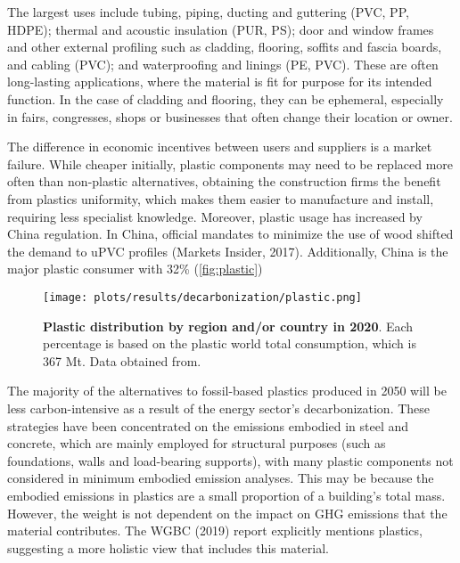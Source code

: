 The largest uses include tubing, piping, ducting and guttering (PVC, PP, HDPE); thermal and acoustic insulation (PUR, PS); door and window frames and other external profiling such as cladding, flooring, soffits and fascia boards, and cabling (PVC); and waterproofing and linings (PE, PVC). These are often long-lasting applications, where the material is fit for purpose for its intended function.\autocite{asbp_2020} In the case of cladding and flooring, they can be ephemeral, especially in fairs, congresses, shops or businesses that often change their location or owner.

The difference in economic incentives between users and suppliers is a market failure. While cheaper initially, plastic components may need to be replaced more often than non-plastic alternatives, obtaining the construction firms the benefit from plastics uniformity, which makes them easier to manufacture and install, requiring less specialist knowledge.\autocite{pickard2020phasing} Moreover, plastic usage has increased by China regulation. In China, official mandates to minimize the use of wood shifted the demand to uPVC profiles (Markets Insider, 2017). Additionally, China is the major plastic consumer with 32\% (\autoref{fig:plastic}) 

\begin{figure}[ht!]
  \centering
  \texttt{[image: plots/results/decarbonization/plastic.png]}
  \caption[Plastic distribution by region and/or country in 2020]{\textbf{Plastic distribution by region and/or country in 2020}. Each percentage is based on the plastic world total consumption, which is 367 Mt. Data obtained from.\autocite{plasticseurpo_2021}}
  \label{fig:plastic}
\end{figure}


The majority of the alternatives to fossil-based plastics produced in 2050 will be less carbon-intensive as a result of the energy sector's decarbonization.\autocite{pickard2020phasing} These strategies have been concentrated on the emissions embodied in steel and concrete, which are mainly employed for structural purposes (such as foundations, walls and load-bearing supports), with many plastic components not considered in minimum embodied emission analyses.\autocite{elkerbout2021impact} This may be because the embodied emissions in plastics are a small proportion of a building’s total mass. However, the weight is not dependent on the impact on GHG emissions that the material contributes. The WGBC (2019) report\autocite{world2019worldgbc} explicitly mentions plastics, suggesting a more holistic view that includes this material. 

